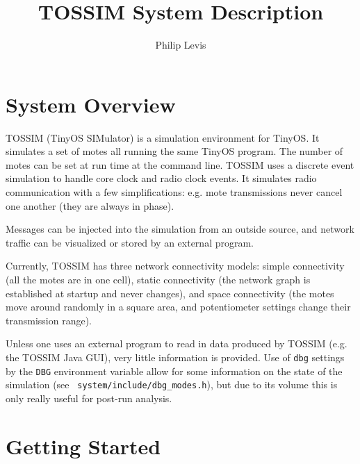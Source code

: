 \documentclass[12pt]{article}
\begin{document}
\fontsize{10}{10}                               %

\title{TOSSIM System Description}
\author{Philip Levis}
\maketitle

\fontsize{10}{10}                               %

\section*{System Overview}

TOSSIM (TinyOS SIMulator) is a simulation environment for TinyOS. It
simulates a set of motes all running the same TinyOS program. The
number of motes can be set at run time at the command line. TOSSIM
uses a discrete event simulation to handle core clock and radio clock
events. It simulates radio communication with a few simplifications:
e.g.  mote transmissions never cancel one another (they are always in
phase).

Messages can be injected into the simulation from an outside source,
and network traffic can be visualized or stored by an external
program.

Currently, TOSSIM has three network connectivity models: simple
connectivity (all the motes are in one cell), static connectivity (the
network graph is established at startup and never changes), and space
connectivity (the motes move around randomly in a square area, and
potentiometer settings change their transmission range).

Unless one uses an external program to read in data produced by TOSSIM
(e.g. the TOSSIM Java GUI), very little information is provided. Use
of {\tt dbg} settings by the {\tt DBG} environment variable allow for
some information on the state of the simulation (see {\tt
system/include/dbg\_modes.h}), but due to its volume this is only
really useful for post-run analysis.

\section*{Getting Started}
\end{document}
